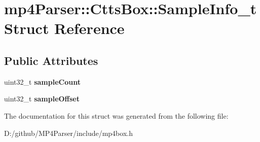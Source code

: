 \hypertarget{structmp4_parser_1_1_ctts_box_1_1_sample_info__t}{}\section{mp4\+Parser\+::Ctts\+Box\+::Sample\+Info\+\_\+t Struct Reference}
\label{structmp4_parser_1_1_ctts_box_1_1_sample_info__t}
\subsection*{Public Attributes}
\begin{DoxyCompactItemize}
\item 
\mbox{\label{structmp4_parser_1_1_ctts_box_1_1_sample_info__t_aef2a4fc03d96b4d3b7415abcc04bcb24}} 
uint32\+\_\+t {\bfseries sample\+Count}
\item 
\mbox{\label{structmp4_parser_1_1_ctts_box_1_1_sample_info__t_a74affd2732826a15bd56dcf0653edb88}} 
uint32\+\_\+t {\bfseries sample\+Offset}
\end{DoxyCompactItemize}


The documentation for this struct was generated from the following file\+:\begin{DoxyCompactItemize}
\item 
D\+:/github/\+M\+P4\+Parser/include/mp4box.\+h\end{DoxyCompactItemize}
